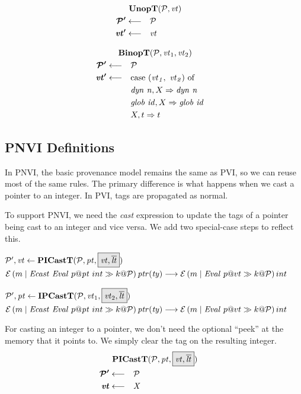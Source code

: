 \documentclass[acmsmall,review,anonymous]{acmart}\settopmatter{printfolios=true,printccs=false,printacmref=false}
\begin{document}
\unopstep

\binopstep

\vspace{\abovedisplayskip}
            
\begin{minipage}[t]{.49\textwidth}            
  \[\begin{aligned}
  \truledef{\unopt}
  \settag{\PCT'}{\PCT}
  \settag{\vt'}{\vt}
  \end{aligned}\]
\end{minipage}
\begin{minipage}[t]{.49\textwidth}           
  \[\begin{aligned}
  \truledef{\binopt}
  \settag{\PCT'}{\PCT}
  \settag{\vt'}{\caseof{(\vt_1,~ \vt_2)}}
  \caseentry{\mathit{dyn ~ n},X}{\mathit{dyn ~ n}} \\
  \caseentry{\mathit{glob ~ id},X}{\mathit{glob ~ id}} \\
  \caseentry{X,t}{t} \\
  \end{aligned}\]
\end{minipage}

\subsection{PNVI Definitions}

In PNVI, the basic provenance model remains the same as PVI, so we can reuse most of the
same rules. The primary difference is what happens when we cast a pointer to an integer.
In PVI, tags are propagated as normal.

To support PNVI, we need the {\it cast} expression to update the tags of a pointer
being cast to an integer and vice versa. We add two special-case steps to reflect this.

            {\(\trule{\picasttres}{\picastt}\)}
            {\(\mathcal{E}\left(m \mid \mathit{Ecast} ~ \mathit{Eval} ~ p@\mathit{pt} ~ int \gg k @ \mathcal{P}\right){\mathit{ptr(ty)}} \longrightarrow
              \mathcal{E}\left(m \mid \mathit{Eval} ~ p@vt \gg k @ \mathcal{P}\right){int}\)}

            {\(\trule{\ipcasttres}{\ipcastt}\)}
            {\(\mathcal{E}\left(m \mid \mathit{Ecast} ~ \mathit{Eval} ~ p@\mathit{pt} ~ int \gg k @ \mathcal{P}\right){\mathit{ptr(ty)}} \longrightarrow
              \mathcal{E}\left(m \mid \mathit{Eval} ~ p@vt \gg k @ \mathcal{P}\right){int}\)}

For casting an integer to a pointer, we don't need the optional ``peek'' at the memory that it points to.
We simply clear the tag on the resulting integer.
\[\begin{aligned}
\truledef{\picastt}
\settag{\PCT'}{\PCT}
\settag{\vt}{X}
\end{aligned}\]
\end{document}
